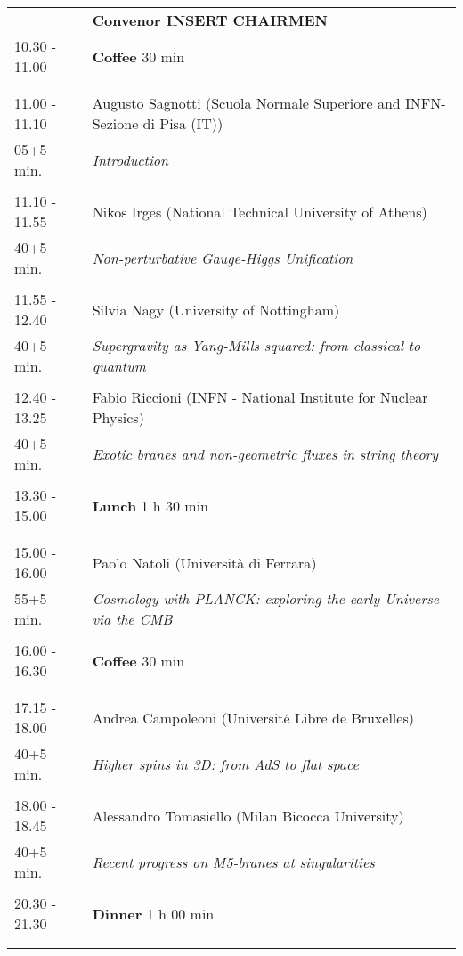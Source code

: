 \begin{longtable}{p{3cm}p{13cm}}
&\hfill {\bf Convenor INSERT CHAIRMEN }\\ 
10.30 - 11.00 & {\bf Coffee} \hfill 30 min \\ 
 & \\ 
 & \\ 
11.00 - 11.10 & Augusto Sagnotti (Scuola Normale Superiore and INFN-Sezione di Pisa (IT))\\ 
05+5 min. & {\it Introduction}\\ 
 & \\ 
11.10 - 11.55 & Nikos Irges (National Technical University of Athens)\\ 
40+5 min. & {\it Non-perturbative Gauge-Higgs Unification}\\ 
 & \\ 
11.55 - 12.40 & Silvia Nagy (University of Nottingham)\\ 
40+5 min. & {\it Supergravity as Yang-Mills squared: from classical to quantum}\\ 
 & \\ 
12.40 - 13.25 & Fabio Riccioni (INFN - National Institute for Nuclear Physics)\\ 
40+5 min. & {\it Exotic branes and non-geometric fluxes in string theory}\\ 
 & \\ 
13.30 - 15.00 & {\bf Lunch} \hfill 1 h 30 min \\ 
 & \\ 
 & \\ 
15.00 - 16.00 & Paolo Natoli (Università di Ferrara)\\ 
55+5 min. & {\it Cosmology with PLANCK: exploring the early Universe via the CMB}\\ 
 & \\ 
16.00 - 16.30 & {\bf Coffee} \hfill 30 min \\ 
 & \\ 
 & \\ 
17.15 - 18.00 & Andrea Campoleoni (Université Libre de Bruxelles)\\ 
40+5 min. & {\it Higher spins in 3D: from AdS to flat space}\\ 
 & \\ 
18.00 - 18.45 & Alessandro Tomasiello (Milan Bicocca University)\\ 
40+5 min. & {\it Recent progress on M5-branes at singularities}\\ 
 & \\ 
20.30 - 21.30 & {\bf Dinner} \hfill 1 h 00 min \\ 
 & \\ 
 & \\ 
\end{longtable}

